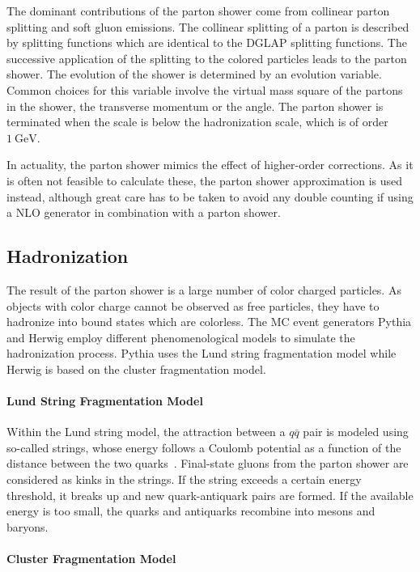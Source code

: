 The dominant contributions of the parton shower  come from collinear parton
splitting and soft gluon emissions. The collinear splitting of a parton is
described by splitting functions which are identical to the DGLAP splitting
functions. The successive application of the splitting to the colored particles
leads to the parton shower. The evolution of the shower is determined by an
evolution variable. Common choices for this variable  involve the virtual mass square of the
partons in the shower, the transverse momentum or the angle. The parton shower
is terminated when the scale is below the hadronization scale, which is of order
$\SI{1}{\GeV}$.

In actuality, the parton shower mimics the effect of higher-order corrections. As
it is often not feasible to calculate these, the parton shower approximation is
used instead, although great care has to be taken to avoid any double counting if
using a NLO generator in combination with a parton shower.

\subsection{Hadronization}

The result of the parton shower is a large number of color charged particles. As
objects with color charge cannot be observed as free particles, they have to
hadronize into bound states which are colorless. The MC event generators Pythia
and Herwig employ different phenomenological models to simulate the
hadronization process. Pythia uses the Lund string fragmentation model while
Herwig is based on the cluster fragmentation model.

\paragraph{Lund String Fragmentation Model}

Within the Lund string model, the attraction between a $q\bar q$ pair is
modeled using so-called strings, whose energy follows a Coulomb potential as a function
of the distance between the two quarks~\cite{Sjostrand:1984ic}. Final-state gluons from the parton
shower are considered as kinks in the strings. If the string exceeds a certain
energy threshold, it breaks up and new quark-antiquark pairs are formed. If the
available energy is too small, the quarks and antiquarks recombine into mesons
and baryons.

\paragraph{Cluster Fragmentation Model}

